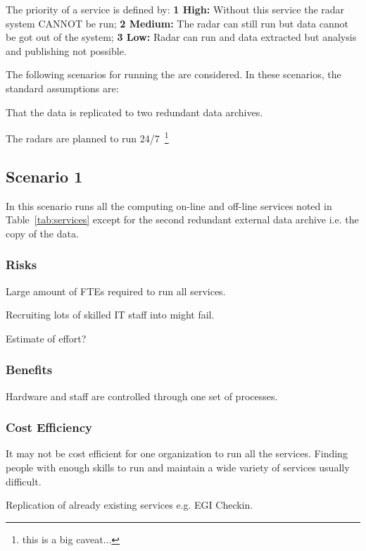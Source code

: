 \documentclass[12pt,a4paper]{article}
\begin{document}
The priority of a service is defined by: {\bf 1 High:} Without this service the radar system CANNOT be run; {\bf 2 Medium:} The radar can still run but data cannot be got out of the system; {\bf 3 Low:} Radar can run and data extracted but analysis and publishing not possible.

The following scenarios for running the \ED \einfra are considered.
In these scenarios, the standard assumptions are:
\bitm
\item That the \ED data is replicated to two redundant data archives.
\item The \ED radars are planned to run 24/7~\footnote{this is a big caveat...}
\eitm

\subsection{Scenario 1}

In this scenario \EC runs all the computing on-line and off-line services noted in Table~\ref{tab:services} except for the second redundant external data archive i.e. the copy of the \ED data.

\subsubsection{Risks}

\bitm
\item Large amount of FTEs required to run all services.
\item Recruiting lots of skilled IT staff into \ESA might fail.
\item Estimate of effort? 
\eitm

\subsubsection{Benefits}
\bitm
\item Hardware and staff are controlled through one set of \EC processes.
\eitm

\subsubsection{Cost Efficiency}
\bitm
\item It may not be cost efficient for one organization to run all the services. Finding people with enough skills to run and maintain a wide variety of services usually difficult.
\item Replication of already existing services e.g. EGI Checkin.
\eitm
\end{document}
